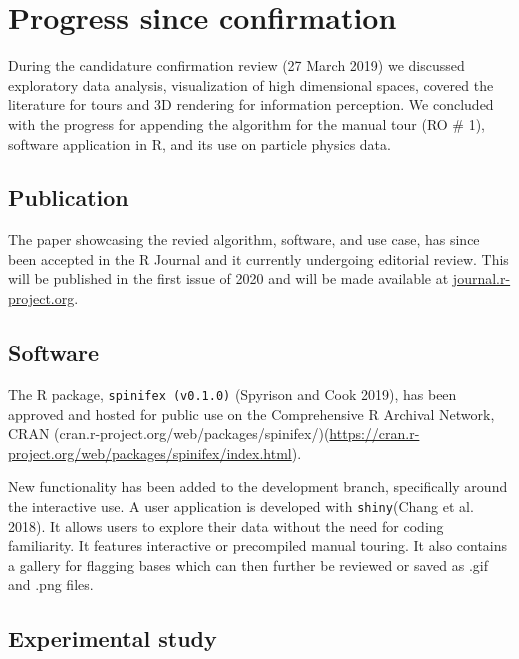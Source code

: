 \documentclass[
  11,
]{article}
\begin{document}
\hypertarget{progress-since-confirmation}{%
\section{Progress since confirmation}\label{progress-since-confirmation}}

During the candidature confirmation review (27 March 2019) we discussed exploratory data analysis, visualization of high dimensional spaces, covered the literature for tours and 3D rendering for information perception. We concluded with the progress for appending the algorithm for the manual tour (RO \# 1), software application in R, and its use on particle physics data.

\hypertarget{publication}{%
\subsection{Publication}\label{publication}}

The paper showcasing the revied algorithm, software, and use case, has since been accepted in the R Journal and it currently undergoing editorial review. This will be published in the first issue of 2020 and will be made available at \href{https://journal.r-project.org/}{journal.r-project.org}.

\hypertarget{software}{%
\subsection{Software}\label{software}}

The R package, \texttt{spinifex\ (v0.1.0)} (Spyrison and Cook 2019), has been approved and hosted for public use on the Comprehensive R Archival Network, CRAN (cran.r-project.org/web/packages/spinifex/)(\url{https://cran.r-project.org/web/packages/spinifex/index.html}).

New functionality has been added to the development branch, specifically around the interactive use. A user application is developed with \texttt{shiny}(Chang et al. 2018). It allows users to explore their data without the need for coding familiarity. It features interactive or precompiled manual touring. It also contains a gallery for flagging bases which can then further be reviewed or saved as .gif and .png files.

\hypertarget{sec:expStudy}{%
\subsection{Experimental study}\label{sec:expStudy}}
\end{document}
